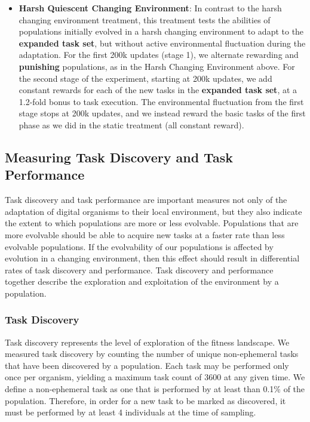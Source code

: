 \documentclass[10pt,letterpaper,final]{article}
\begin{document}
\begin{itemize}
	\item \textbf{Harsh Quiescent Changing Environment}: In contrast to the harsh changing environment treatment, this treatment tests the abilities of populations initially evolved in a harsh changing environment to adapt to the \textbf{expanded task set}, but without active environmental fluctuation during the adaptation. For the first 200k updates (stage 1), we alternate rewarding and \textbf{punishing} populations, as in the Harsh Changing Environment above. For the second stage of the experiment, starting at 200k updates, we add constant rewards for each of the new tasks in the \textbf{expanded task set}, at a 1.2-fold bonus to task execution. The environmental fluctuation from the first stage stops at 200k updates, and we instead reward the basic tasks of the first phase as we did in the static treatment (all constant reward).
\end{itemize}




\subsection*{Measuring Task Discovery and Task Performance}
Task discovery and task performance are important measures not only of the adaptation of digital organisms to their local environment, but they also indicate the extent to which populations are more or less evolvable. Populations that are more evolvable should be able to acquire new tasks at a faster rate than less evolvable populations. If the evolvability of our populations is affected by evolution in a changing environment, then this effect should result in differential rates of task discovery and performance. Task discovery and performance together describe the exploration and exploitation of the environment by a population. 

\subsubsection*{Task Discovery}
Task discovery represents the level of exploration of the fitness landscape. We measured task discovery by counting the number of unique non-ephemeral tasks that have been discovered by a population. Each task may be performed only once per organism, yielding a maximum task count of 3600 at any given time. We define a non-ephemeral task as one that is performed by at least than 0.1\% of the population. 
Therefore, in order for a new task to be marked as discovered, it must be performed by at least 4 individuals at the time of sampling.
\end{document}

